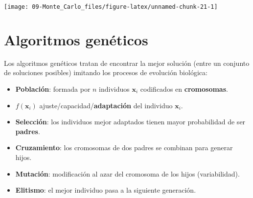 \documentclass[
]{book}
\newenvironment{Shaded}{\begin{snugshade}}{\end{snugshade}}
\newcommand{\AttributeTok}[1]{\textcolor[rgb]{0.77,0.63,0.00}{#1}}
\newcommand{\ControlFlowTok}[1]{\textcolor[rgb]{0.13,0.29,0.53}{\textbf{#1}}}
\newcommand{\DecValTok}[1]{\textcolor[rgb]{0.00,0.00,0.81}{#1}}
\newcommand{\FunctionTok}[1]{\textcolor[rgb]{0.00,0.00,0.00}{#1}}
\newcommand{\NormalTok}[1]{#1}
\newcommand{\OtherTok}[1]{\textcolor[rgb]{0.56,0.35,0.01}{#1}}
\newcommand{\SpecialCharTok}[1]{\textcolor[rgb]{0.00,0.00,0.00}{#1}}
\newcommand{\StringTok}[1]{\textcolor[rgb]{0.31,0.60,0.02}{#1}}
\theoremstyle{break}
\theoremstyle{definition}
\theoremstyle{definition}
\theoremstyle{definition}
\theoremstyle{definition}
\theoremstyle{remark}
\begin{document}
\begin{Shaded}
\end{Shaded}

\begin{center}\texttt{[image: 09-Monte\_Carlo\_files/figure-latex/unnamed-chunk-21-1]} \end{center}

\hypertarget{algoritmos-genuxe9ticos}{%
\section{Algoritmos genéticos}\label{algoritmos-genuxe9ticos}}

Los algoritmos genéticos tratan de encontrar la mejor solución
(entre un conjunto de soluciones posibles) imitando los procesos de
evolución biológica:

\begin{itemize}
\item
  \textbf{Población}: formada por \(n\) individuos \(\mathbf{x}_i\)
  codificados en \textbf{cromosomas}.
\item
  \(f(\mathbf{x}_i)\) ajuste/capacidad/\textbf{adaptación} del
  individuo \(\mathbf{x}_i\).
\item
  \textbf{Selección}: los individuos mejor adaptados tienen mayor
  probabilidad de ser \textbf{padres}.
\item
  \textbf{Cruzamiento}: los cromosomas de dos padres se combinan para
  generar hijos.
\item
  \textbf{Mutación}: modificación al azar del cromosoma de los
  hijos (variabilidad).
\item
  \textbf{Elitismo}: el mejor individuo pasa a la siguiente generación.
\end{itemize}
\end{document}
